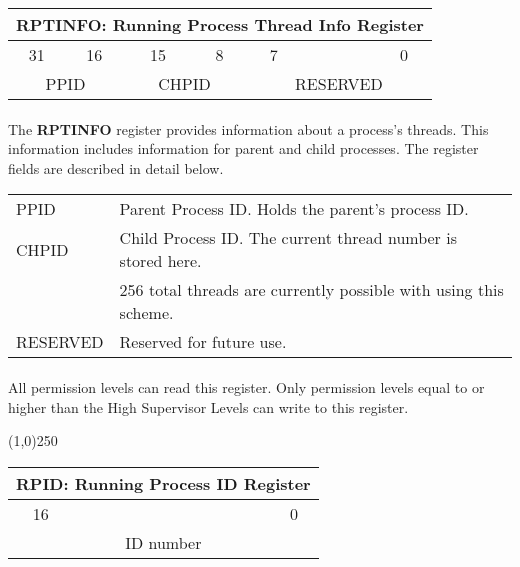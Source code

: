 \documentclass[letterpaper, 11pt]{article}
\begin{document}
\begin{center}
	\begin{tabular}{|cc|cc|cccc|}
		\multicolumn{8}{c}{\textbf{RPTINFO}: Running Process Thread Info Register} \\ \hline
		31\hfill & 16\hfill  & 15\hfill & \hfill 8 & 7 \hfill & \hfill & \hfill &\hfill	0 \\ \hline
		 \multicolumn{2}{|c|}{PPID} & \multicolumn{2}{|c|}{CHPID} & \multicolumn{4}{|c|}{RESERVED} \\ \hline
		
	\end{tabular}
\end{center}

\paragraph{} The \textbf{RPTINFO} register provides information about a process's threads. This information includes information for parent and child processes. The register fields are described in detail below.

\begin{tabular}{l l}

	PPID		& Parent Process ID. Holds the parent's process ID. \\
	CHPID		& Child Process ID. The current thread number is stored here. \\
	\hfill		& 256 total threads are currently possible with using this scheme. \\
	RESERVED	& Reserved for future use. \\
\end{tabular}
\paragraph{} All permission levels can read this register. Only permission levels equal to or higher than the High Supervisor Levels can write to this register. 
\begin{center}
	\line(1,0){250}
\end{center}
\vspace{1cm}

\begin{center}
	\begin{tabular}{|cccccccc|}
		\multicolumn{8}{c}{\textbf{RPID}: Running Process ID  Register} \\ \hline
		16 & \hfill & \hfill & \hfill &	\hfill & \hfill & \hfill & \hfill0 \\ \hline
		\multicolumn{8}{|c|}{ID number}  \\ \hline

	\end{tabular}
\end{center}
\end{document}
